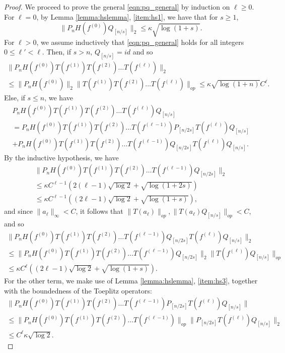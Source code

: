 \documentclass[11pt]{amsart}
\theoremstyle{plain}
\theoremstyle{remark}
\numberwithin{equation}{section}
\begin{document}
\begin{proof}
We proceed to prove the general \eqref{eqn:pq_general} by induction on $\ell\geq 0$. 
%
\medskip
 \\For $\ell=0$, by Lemma \ref{lemma:hslemma}, \eqref{item:hs1}, we have that for $s\geq 1$,
\begin{equation}
\|P_nH(f^{(0)})Q_{[n/s]}\|_2 \leq \kappa\sqrt{\log(1+s)}.
\end{equation}
%
%
%
%
%
For $\ell>0$, we assume inductively that \eqref{eqn:pq_general} holds for all integers $0\leq\ell'<\ell$. 
%
Then, if $s>n$, $Q_{[n/s]}=id$ and so
 \begin{multline}
 \|P_n H(f^{(0)}) T(f^{(1)}) T(f^{(2)})\ldots T(f^{(\ell)}) \|_2
\\
 \leq 
 \|P_nH(f^{(0)})\|_2
 \|T(f^{(1)}) T(f^{(2)})\ldots T(f^{(\ell)})\|_{op}\leq 
\kappa \sqrt{\log(1+n)}C^{\ell}.
 \end{multline}
Else, if $s\leq n$, we have 
\begin{multline}
P_n H(f^{(0)}) T(f^{(1)}) T(f^{(2)})\ldots T(f^{(\ell)})Q_{[n/s]}
\\= P_n H(f^{(0)}) T(f^{(1)}) T(f^{(2)})\ldots T(f^{(\ell-1)})P_{[n/2s]} T(f^{(\ell)})Q_{[n/s]}
\\+
P_n H(f^{(0)}) T(f^{(1)}) T(f^{(2)})\ldots T(f^{(\ell-1)}) Q_{[n/2s]} T(f^{(\ell)})Q_{[n/s]}.
\end{multline}
By the inductive hypothesis, we have
\begin{multline}
\|P_n H(f^{(0)}) T(f^{(1)}) T(f^{(2)})\ldots T(f^{(\ell-1)}) Q_{[n/2s]}\|_2
\\\leq \kappa C^{\ell-1}\left(2(\ell-1)\sqrt{\log 2}+\sqrt{\log(1+2s)} \right)
\\\leq \kappa C^{\ell-1} \left((2\ell-1)\sqrt{\log 2}+\sqrt{\log(1+s)} \right),
\end{multline} 
and since $\|a_{\ell}\|_{\infty}<C$, it follows that 
$\|T(a_{\ell})\|_{op}, \| T(a_{\ell})Q_{[n/s]}\|_{op}<C$, and so
\begin{multline}\label{eqn:proofequation1}
\|P_n H(f^{(0)}) T(f^{(1)}) T(f^{(2)})\ldots T(f^{(\ell-1)})Q_{[n/2s]} T(f^{(\ell)})Q_{[n/s]}
\|_2
\\
\leq 
\|P_n H(f^{(0)}) T(f^{(1)}) T(f^{(2)})\ldots T(f^{(\ell-1)})Q_{[n/2s]}\|_2  
\|T(f^{(\ell)})Q_{[n/s]}\|_{op}
\\ 
\leq \kappa C^{\ell} \left((2\ell-1)\sqrt{\log 2}+\sqrt{\log(1+s)} \right).
\end{multline}
For the other term, we make use of Lemma \ref{lemma:hslemma}, \eqref{item:hs3}, together with the boundedness of the Toeplitz operators:
\begin{multline} \label{eqn:proofequation2}
\|P_n H(f^{(0)}) T(f^{(1)}) T(f^{(2)})\ldots T(f^{(\ell-1)})P_{[n/2s]} T(f^{(\ell)})Q_{[n/s]}\|
\\
\leq 
\|P_n H(f^{(0)}) T(f^{(1)}) T(f^{(2)})\ldots T(f^{(\ell-1)})\|_{op}\|P_{[n/2s]} T(f^{(\ell)})Q_{[n/s]}\|_2
\\
\leq
 C^{\ell} \kappa \sqrt{\log 2}.
\end{multline}



\end{proof}
\end{document}
